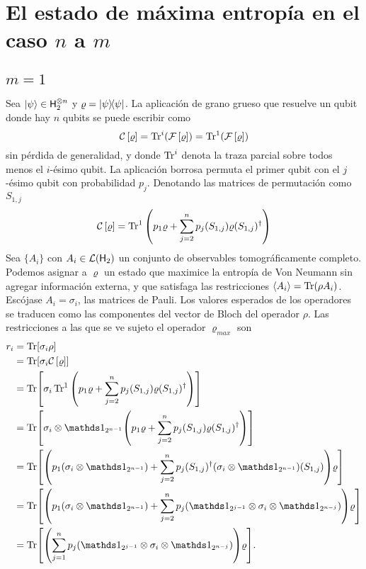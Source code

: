 \section{El estado de máxima entropía en el caso $n$ a $m$}
\subsection{$m=1$}
Sea $\ket{\psi}\in{\sf H}_{2}^{\otimes n}$ y $\varrho=\dyad{\psi}$. La aplicación de grano grueso que resuelve un qubit donde hay $n$ qubits se puede escribir como
\begin{equation*}
    \mathcal{C}\left[\varrho\right]=\Tr^{i}(\mathcal{F}\left[\varrho\right])=\Tr^{1}(\mathcal{F}\left[\varrho\right])
\end{equation*}
sin pérdida de generalidad, y donde $\Tr^{i}$ denota la traza parcial sobre todos menos el $i$-ésimo qubit. La aplicación borrosa permuta el primer qubit con el $j$-ésimo qubit con probabilidad $p_{j}$. Denotando las matrices de permutación como $S_{1,j}$
\begin{equation*}
    \mathcal{C}\left[\varrho\right]=\Tr^{1}\qty(p_{1}\varrho+\sum_{j=2}^{n}p_{j}(S_{1,j})\varrho(S_{1,j})^{\dagger})
\end{equation*}
Sea $\{A_{i}\}$ con $A_{i}\in\mathcal{L}({\sf H}_{2})$ un conjunto de observables tomográficamente completo. Podemos asignar a $\varrho$ un estado que maximice la entropía de Von Neumann sin agregar información externa, y que satisfaga las restricciones $\expval{A_{i}}=\Tr(\rho A_{i})$. Escójase ${A_{i}}={\sigma_{i}}$, las matrices de Pauli. Los valores esperados de los operadores se traducen como las componentes del vector de Bloch del operador $\rho$. Las restricciones a las que se ve sujeto el operador $\varrho_{max}$ son
\begin{align*}
    r_{i}&=\Tr[\sigma_{i}\rho]\\
    &=\Tr[\sigma_{i}\CG{\varrho}]\\
    &=\Tr[\sigma_{i}\Tr^{1}\qty(p_{1}\varrho+\sum_{j=2}^{n}p_{j}(S_{1,j})\varrho(S_{1,j})^{\dagger})]\\
    &=\Tr[\sigma_{i}\otimes\Id_{2^{n-1}}\qty(p_{1}\varrho+\sum_{j=2}^{n}p_{j}(S_{1,j})\varrho(S_{1,j})^{\dagger})]\\
    &=\Tr[\qty(p_{1}(\sigma_{i}\otimes\Id_{2^{n-1}})+\sum_{j=2}^{n}p_{j}(S_{1,j})^{\dagger}(\sigma_{i}\otimes\Id_{2^{n-1}})(S_{1,j}))\varrho]\\
    &=\Tr[\qty(p_{1}(\sigma_{i}\otimes\Id_{2^{n-1}})+\sum_{j=2}^{n}p_{j}(\Id_{2^{j-1}}\otimes\sigma_{i}\otimes\Id_{2^{n-j}}))\varrho]\\
    &=\Tr[\qty(\sum_{j=1}^{n}p_{j}(\Id_{2^{j-1}}\otimes\sigma_{i}\otimes\Id_{2^{n-j}}))\varrho].
\end{align*}
